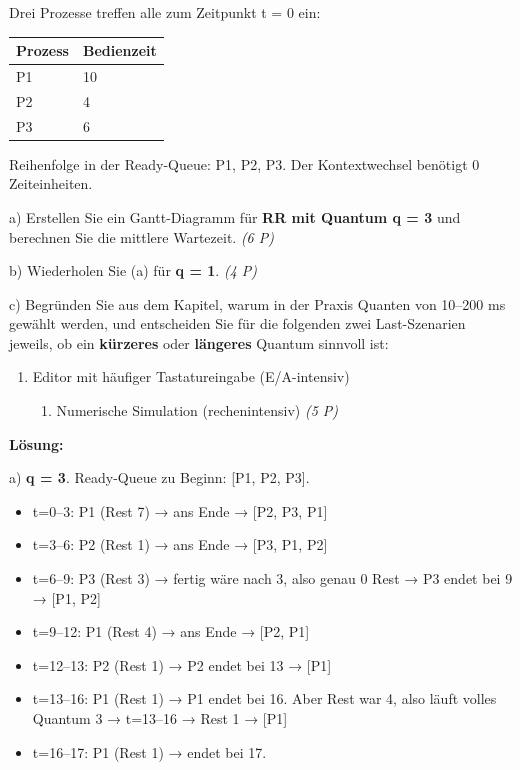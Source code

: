 \documentclass[11pt, a4paper]{article}
\begin{document}
Drei Prozesse treffen alle zum Zeitpunkt t = 0 ein:



{\small
\begin{tabularx}{\linewidth}{XX}
\hline
\rowcolor{tableheadbg}
{\color{white}\textbf{Prozess}} & {\color{white}\textbf{Bedienzeit}} \\[2pt]
\hline
\endhead
\hline
\endfoot
P1 & 10 \\
P2 & 4 \\
P3 & 6 \\
\end{tabularx}
}


Reihenfolge in der Ready-Queue: P1, P2, P3. Der Kontextwechsel benötigt 0 Zeiteinheiten.


a) Erstellen Sie ein Gantt-Diagramm für \textbf{RR mit Quantum q = 3} und berechnen Sie die mittlere Wartezeit. \textit{(6 P)}


b) Wiederholen Sie (a) für \textbf{q = 1}. \textit{(4 P)}


c) Begründen Sie aus dem Kapitel, warum in der Praxis Quanten von 10–200 ms gewählt werden, und entscheiden Sie für die folgenden zwei Last-Szenarien jeweils, ob ein \textbf{kürzeres} oder \textbf{längeres} Quantum sinnvoll ist:

\begin{enumerate}
  \item Editor mit häufiger Tastatureingabe (E/A-intensiv)
\begin{enumerate}
  \item Numerische Simulation (rechenintensiv) \textit{(5 P)}
\end{enumerate}
\end{enumerate}

\textbf{Lösung:}


a) \textbf{q = 3}. Ready-Queue zu Beginn: [P1, P2, P3].


\begin{itemize}
  \item t=0–3: P1 (Rest 7) → ans Ende → [P2, P3, P1]
  \item t=3–6: P2 (Rest 1) → ans Ende → [P3, P1, P2]
  \item t=6–9: P3 (Rest 3) → fertig wäre nach 3, also genau 0 Rest → P3 endet bei 9 → [P1, P2]
  \item t=9–12: P1 (Rest 4) → ans Ende → [P2, P1]
  \item t=12–13: P2 (Rest 1) → P2 endet bei 13 → [P1]
  \item t=13–16: P1 (Rest 1) → P1 endet bei 16. Aber Rest war 4, also läuft volles Quantum 3 → t=13–16 → Rest 1 → [P1]
  \item t=16–17: P1 (Rest 1) → endet bei 17.
\end{itemize}
\end{document}
